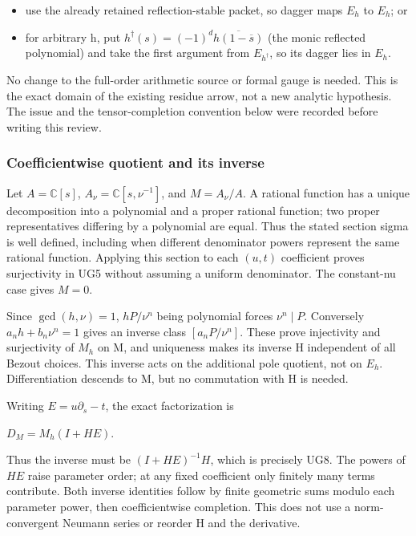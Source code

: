 \documentclass{article}
\begin{document}
\begin{itemize}
\tightlist
\item
  use the already retained reflection-stable packet, so dagger maps \(E_h\) to \(E_h\); or
\item
  for arbitrary h, put \(h^\dagger(s)=(-1)^d\overline{h(1-\overline s)}\) (the monic reflected polynomial) and take the first argument from \(E_{h^\dagger}\), so its dagger lies in \(E_h\).
\end{itemize}

No change to the full-order arithmetic source or formal gauge is needed. This is the exact domain of the existing residue arrow, not a new analytic hypothesis. The issue and the tensor-completion convention below were recorded before writing this review.

\subsubsection{Coefficientwise quotient and its inverse}\label{endpoint-f1_unit_gauge_review--coefficientwise-quotient-and-its-inverse}

Let \(A=\mathbb C[s]\), \(A_\nu=\mathbb C[s,\nu^{-1}]\), and \(M=A_\nu/A\). A rational function has a unique decomposition into a polynomial and a proper rational function; two proper representatives differing by a polynomial are equal. Thus the stated section sigma is well defined, including when different denominator powers represent the same rational function. Applying this section to each \((u,t)\) coefficient proves surjectivity in UG5 without assuming a uniform denominator. The constant-nu case gives \(M=0\).

Since \(\gcd(h,\nu)=1\), \(hP/\nu^n\) being polynomial forces \(\nu^n\mid P\). Conversely \(a_n h+b_n\nu^n=1\) gives an inverse class \([a_n P/\nu^n]\). These prove injectivity and surjectivity of \(M_h\) on M, and uniqueness makes its inverse H independent of all Bezout choices. This inverse acts on the additional pole quotient, not on \(E_h\). Differentiation descends to M, but no commutation with H is needed.

Writing \(E=u\partial_s-t\), the exact factorization is

\(D_M=M_h(I+HE)\).

Thus the inverse must be \((I+HE)^{-1}H\), which is precisely UG8. The powers of \(HE\) raise parameter order; at any fixed coefficient only finitely many terms contribute. Both inverse identities follow by finite geometric sums modulo each parameter power, then coefficientwise completion. This does not use a norm-convergent Neumann series or reorder H and the derivative.
\end{document}
